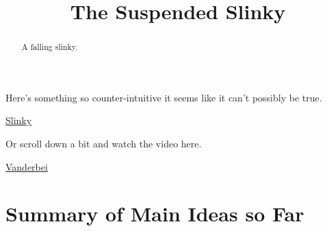 \documentclass{ximera}
\title{The Suspended Slinky}
\begin{document}
\begin{abstract}
A falling slinky.
\end{abstract}
\maketitle

Here's something so counter-intuitive it seems like it can't possibly be true.

\begin{center}  
\end{center}


\href{https://www.youtube.com/watch?v=k5s1cMNTmGs}{Slinky}



Or scroll down a bit and watch the video here.

\href{dsffdhttps://vanderbei.princeton.edu/WebGL/Slinky.html}{Vanderbei}


\section{Summary of Main Ideas so Far}
\end{document}
